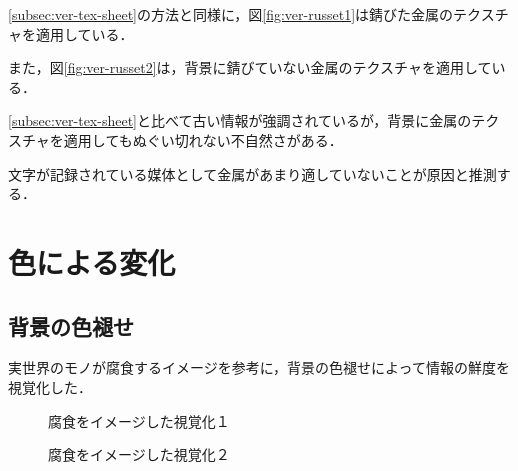 \ref{subsec:ver-tex-sheet}の方法と同様に，図\ref{fig:ver-russet1}は錆びた金属のテクスチャを適用している．

また，図\ref{fig:ver-russet2}は，背景に錆びていない金属のテクスチャを適用している．

\ref{subsec:ver-tex-sheet}と比べて古い情報が強調されているが，背景に金属のテクスチャを適用してもぬぐい切れない不自然さがある．

文字が記録されている媒体として金属があまり適していないことが原因と推測する．

\section{色による変化}
\label{sec:ver-color}

\subsection{背景の色褪せ}
\label{subsec:ver-col-cor}

実世界のモノが腐食するイメージを参考に，背景の色褪せによって情報の鮮度を視覚化した．

\begin{figure}[htbp]
  \begin{minipage}{0.5\hsize}
    \begin{center}
    \end{center}
    \caption{腐食をイメージした視覚化１}
    \label{fig:ver-corrosion1}
  \end{minipage}
  \begin{minipage}{0.5\hsize}
    \begin{center}
    \end{center}
    \caption{腐食をイメージした視覚化２}
    \label{fig:ver-corrosion2}
  \end{minipage}
\end{figure}

